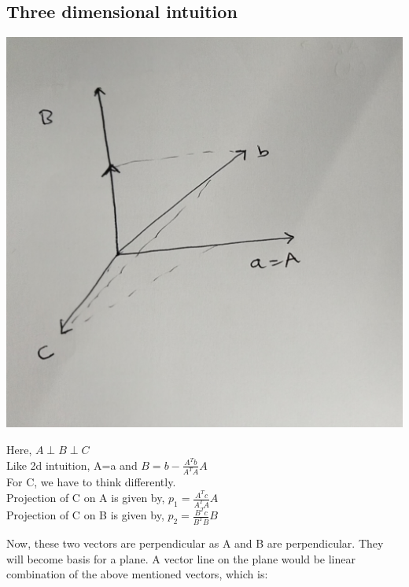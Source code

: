 \documentclass[]{article}
\begin{document}
\subsection{Three dimensional intuition}
\vspace{10pt}

\vspace{12pt}
\begin{center}
	\includegraphics[scale=.25]{gram2}
\end{center}
\vspace{10pt}
\noindent
Here, $A \perp B \perp C$\\

\noindent
Like 2d intuition, A=a and $B=b-\frac{A^Tb}{A^TA}A$\\

\noindent
For C, we have to think differently.\\

\noindent
Projection of C on A is given by,
$p_1=\frac{A^Tc}{A^TA}A$\\

\noindent
Projection of C on B is given by,
$p_2=\frac{B^Tc}{B^TB}B$

\noindent
Now, these two vectors are perpendicular as A and B are perpendicular. They will become basis for a plane. A vector line on the plane would be linear combination of the above mentioned vectors, which is:\\
\end{document}
